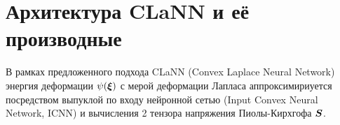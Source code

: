 



\section{Архитектура CLaNN и её производные}


В рамках предложенного подхода CLaNN (Convex Laplace Neural Network) энергия деформации \(\psi(\boldsymbol{\xi})\)
с мерой деформации Лапласа аппроксимириуется посредством выпуклой по входу нейронной сетью (Input Convex Neural Network, ICNN) \cite{icnn2017}
и вычисления 2 тензора напряжения Пиолы-Кирхгофа \(\boldsymbol{S}\). 



